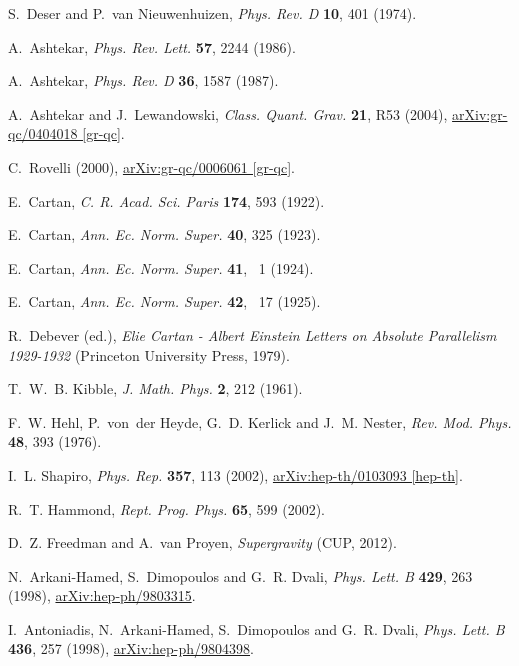 \documentclass{ws-mpla}
\renewcommand{\(}{\left(}
\renewcommand{\)}{\right)}
\renewcommand{\[}{\left[}
\renewcommand{\]}{\right]}
\begin{document}
\begin{thebibliography}{10}
S.~Deser and P.~van Nieuwenhuizen, {\em Phys. Rev. D} {\bf 10},   401  (1974).

A.~Ashtekar, {\em Phys. Rev. Lett.} {\bf 57}, 2244  (1986).

A.~Ashtekar, {\em Phys. Rev. D} {\bf 36},   1587  (1987).

A.~Ashtekar and J.~Lewandowski, {\em Class. Quant. Grav.} {\bf 21},   R53
  (2004), \href{http://arxiv.org/abs/gr-qc/0404018}{{\ttfamily
  arXiv:gr-qc/0404018 [gr-qc]}}.

C.~Rovelli  (2000), \href{http://arxiv.org/abs/gr-qc/0006061}{{\ttfamily
  arXiv:gr-qc/0006061 [gr-qc]}}.

E.~Cartan, {\em C. R. Acad. Sci. Paris} {\bf 174},   593  (1922).

E.~Cartan, {\em Ann. Ec. Norm. Super.} {\bf 40},   325  (1923).

E.~Cartan, {\em Ann. Ec. Norm. Super.} {\bf 41},  ~1  (1924).

E.~Cartan, {\em Ann. Ec. Norm. Super.} {\bf 42},  ~17  (1925).

R.~Debever (ed.), {\em Elie Cartan - Albert Einstein Letters on Absolute
  Parallelism 1929-1932} (Princeton University Press, 1979).

T.~W.~B. Kibble, {\em J. Math. Phys.} {\bf 2}, 212  (1961).

F.~W. Hehl, P.~von~der Heyde, G.~D. Kerlick and J.~M. Nester, {\em Rev. Mod.
  Phys.} {\bf 48},   393  (1976).

I.~L. Shapiro, {\em Phys. Rep.} {\bf 357},   113  (2002),
  \href{http://arxiv.org/abs/hep-th/0103093}{{\ttfamily arXiv:hep-th/0103093
  [hep-th]}}.

R.~T. Hammond, {\em Rept. Prog. Phys.} {\bf 65},   599  (2002).

D.~Z. Freedman and A.~van Proyen, {\em Supergravity} (CUP, 2012).

N.~Arkani-Hamed, S.~Dimopoulos and G.~R. Dvali, {\em Phys. Lett. B} {\bf 429},
  263  (1998), \href{http://arxiv.org/abs/hep-ph/9803315}{{\ttfamily
  arXiv:hep-ph/9803315}}.

I.~Antoniadis, N.~Arkani-Hamed, S.~Dimopoulos and G.~R. Dvali, {\em Phys. Lett.
  B} {\bf 436},   257  (1998),
  \href{http://arxiv.org/abs/hep-ph/9804398}{{\ttfamily arXiv:hep-ph/9804398}}.


\end{thebibliography}
\end{document}
